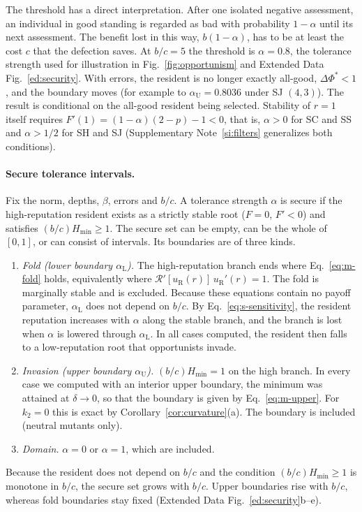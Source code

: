 \documentclass[10pt]{wlscirep}
\newcommand{\Rmap}{\mathscr{R}}            %
\newcommand{\dPhi}{\Delta\Phi^{*}}
\newcommand{\Hmin}{H_{\min}}
\theoremstyle{plain}
\theoremstyle{remark}
\begin{document}
The threshold has a direct interpretation. After one isolated negative assessment, an individual in good standing is regarded as bad with probability $1-\alpha$ until its next assessment. The benefit lost in this way, $b(1-\alpha)$, has to be at least the cost $c$ that the defection saves. At $b/c=5$ the threshold is $\alpha=0.8$, the tolerance strength used for illustration in Fig.~\ref{fig:opportunism} and Extended Data Fig.~\ref{ed:security}. With errors, the resident is no longer exactly all-good, $\dPhi<1$, and the boundary moves (for example to $\alpha_{\mathrm U}=0.8036$ under SJ $(4,3)$). The result is conditional on the all-good resident being selected. Stability of $r=1$ itself requires $F'(1)=(1-\alpha)(2-p)-1<0$, that is, $\alpha>0$ for SC and SS and $\alpha>1/2$ for SH and SJ (Supplementary Note~\ref{si:filters} generalizes both conditions).

\paragraph{Secure tolerance intervals.} Fix the norm, depths, $\beta$, errors and $b/c$. A tolerance strength $\alpha$ is secure if the high-reputation resident exists as a strictly stable root ($F=0$, $F'<0$) and satisfies $(b/c)\Hmin\geq1$. The secure set can be empty, can be the whole of $[0,1]$, or can consist of intervals. Its boundaries are of three kinds.
\begin{enumerate}
\item \textit{Fold (lower boundary $\alpha_{\mathrm L}$).} The high-reputation branch ends where Eq.~\eqref{eq:m-fold} holds, equivalently where $\Rmap'[u_{\mathrm R}(r)]\,u_{\mathrm R}'(r)=1$. The fold is marginally stable and is excluded. Because these equations contain no payoff parameter, $\alpha_{\mathrm L}$ does not depend on $b/c$. By Eq.~\eqref{eq:s-sensitivity}, the resident reputation increases with $\alpha$ along the stable branch, and the branch is lost when $\alpha$ is lowered through $\alpha_{\mathrm L}$. In all cases computed, the resident then falls to a low-reputation root that opportunists invade.
\item \textit{Invasion (upper boundary $\alpha_{\mathrm U}$).} $(b/c)\Hmin=1$ on the high branch. In every case we computed with an interior upper boundary, the minimum was attained at $\delta\to0$, so that the boundary is given by Eq.~\eqref{eq:m-upper}. For $k_2=0$ this is exact by Corollary~\ref{cor:curvature}(a). The boundary is included (neutral mutants only).
\item \textit{Domain.} $\alpha=0$ or $\alpha=1$, which are included.
\end{enumerate}
Because the resident does not depend on $b/c$ and the condition $(b/c)\Hmin\geq1$ is monotone in $b/c$, the secure set grows with $b/c$. Upper boundaries rise with $b/c$, whereas fold boundaries stay fixed (Extended Data Fig.~\ref{ed:security}b--e).
\end{document}
